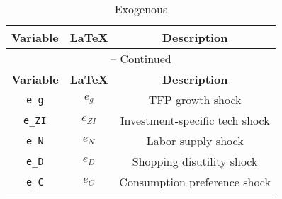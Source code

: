 \begin{center}
\begin{longtable}{ccc}
\caption{Exogenous}\\%
\hline%
\multicolumn{1}{c}{\textbf{Variable}} &
\multicolumn{1}{c}{\textbf{\LaTeX}} &
\multicolumn{1}{c}{\textbf{Description}}\\%
\hline\hline%
\endfirsthead
\multicolumn{3}{c}{{\tablename} \thetable{} -- Continued}\\%
\hline%
\multicolumn{1}{c}{\textbf{Variable}} &
\multicolumn{1}{c}{\textbf{\LaTeX}} &
\multicolumn{1}{c}{\textbf{Description}}\\%
\hline\hline%
\endhead
\texttt{e\_g} & ${e_g}$ & TFP growth shock\\
\texttt{e\_ZI} & ${e_{ZI}}$ & Investment-specific tech shock\\
\texttt{e\_N} & ${e_N}$ & Labor supply shock\\
\texttt{e\_D} & ${e_D}$ & Shopping disutility shock\\
\texttt{e\_C} & ${e_C}$ & Consumption preference shock\\
\hline%
\end{longtable}
\end{center}
